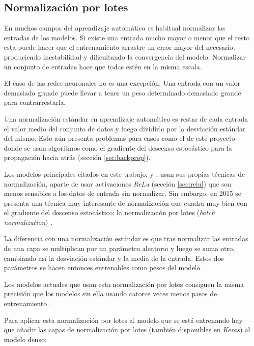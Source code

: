 \subsection{Normalización por lotes}

En muchos campos del aprendizaje automático es habitual normalizar las entradas
de los modelos. Si existe una entrada mucho mayor o menor que el resto esta
puede hacer que el entrenamiento arrastre un error mayor del necesario,
produciendo inestabilidad y dificultando la convergencia del modelo. Normalizar
un conjunto de entradas hace que todas estén en la misma escala. 

El caso de las redes neuronales no es una excepción. Una entrada con un valor
demasiado grande puede llevar a tener un peso determinado demasiado grande para
contrarrestarla.

Una normalización estándar en aprendizaje automático es restar de cada entrada
el valor medio del conjunto de datos y luego dividirlo por la desviación
estándar del mismo. Esto aún presenta problemas para casos como el de este
proyecto donde se usan algoritmos como el gradiente del descenso estocástico
para la propagación hacia atrás (sección \ref{sec:backprop}).

Los modelos principales citados en este trabajo,
\parencite{krizhevsky2012imagenet} y \parencite{simonyan}, usan sus propias
técnicas de normalización, aparte de usar activaciones \textit{ReLu} (sección
\ref{sec:relu}) que son menos sensibles a los datos de entrada sin normalizar.
Sin embargo, en 2015 se presenta una técnica muy interesante de normalización
que cuadra muy bien con el gradiente del descenso estocástico: la normalización
por lotes (\textit{batch normalization}) \parencite{batch_normalization}.

La diferencia con una normalización estándar es que tras normalizar las
entradas de una capa se multiplican por un parámetro aleatorio y luego se
suma otro, cambiando así la desviación estándar y la media de la entrada. Estos
dos parámetros se hacen entonces entrenables como pesos del modelo.

Los modelos actuales que usan esta normalización por lotes consiguen la misma
precisión que los modelos sin ella usando catorce veces menos pasos de
entrenamiento \parencite{batch_normalization}.

Para aplicar esta normalización por lotes al modelo que se está entrenando hay
que añadir las capas de normalización por lotes (también disponibles en
\textit{Keras}) al modelo denso:


